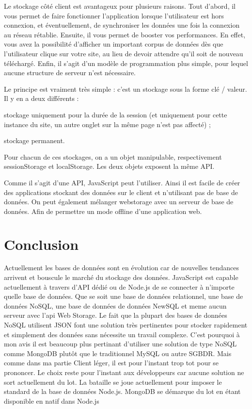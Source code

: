 Le stockage côté client est avantageux pour plusieurs raisons. Tout d'abord, il vous permet de faire fonctionner l'application lorsque l'utilisateur est hors connexion, et éventuellement, de synchroniser les données une fois la connexion au réseau rétablie. Ensuite, il vous permet de booster vos performances. En effet, vous avez la possibilité d'afficher un important corpus de données dès que l'utilisateur clique sur votre site, au lieu de devoir attendre qu'il soit de nouveau téléchargé. Enfin, il s'agit d'un modèle de programmation plus simple, pour lequel aucune structure de serveur n'est nécessaire.


Le principe est vraiment très simple : c’est un stockage sous la forme clé / valeur. Il y en a deux différents :
\begin{list}{•}{}
  \item 
  stockage uniquement pour la durée de la session (et uniquement pour cette instance du site, un autre onglet sur la même page n’est pas affecté) ;
    
  \item
  stockage permanent.

\end{list}
 Pour chacun de ces stockages, on a un objet manipulable, respectivement sessionStorage et localStorage. Les deux objets exposent la même API.
 
 Comme il s'agit d'une API, JavaScript peut l'utiliser. Ainsi il est facile de créer des applications stockant des données sur le client et n'utilisant pas de base de données. On peut également mélanger webstorage avec un serveur de base de données. Afin de permettre un mode offline d'une application web.

\section{Conclusion}

Actuellement les bases de données sont en évolution car de nouvelles tendances arrivent et bouscule le marché du stockage des données.
JavaScript est capable actuellement à travers d'API dédié ou de Node.js de se connecter à n'importe quelle base de données. Que se soit une base de données relationnel, une base de données NoSQL, une base de données de données NewSQL et meme aucun serveur avec l'api Web Storage. Le fait que la plupart des bases de données NoSQL utilisent JSON font une solution très pertinentes pour stocker rapidement et simplement des données sans nécessite un travail complexe. C'est pourquoi à mon avis il est beaucoup plus pertinant d'utiliser une solution de type NoSQL comme MongoDB plutôt que le traditionnel MySQL ou autre SGBDR. Mais comme dans ma partie Client léger, il est pour l'instant trop tot pour se prononcer. Le choix reste pour l'instant aux développeurs car aucune solution ne sort actuellement du lot. La bataille se joue actuellement pour imposer le standard de la base de données Node.js. MongoDB se démarque du lot en étant disponible en natif dans Node.js


